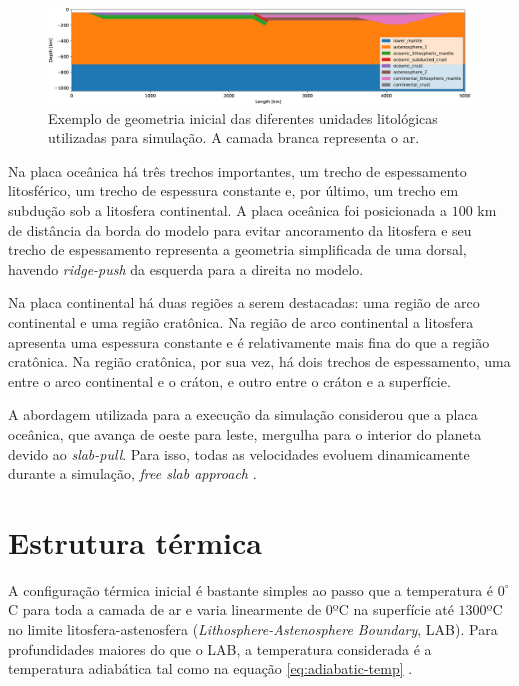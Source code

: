 \begin{figure}
    \centering
    \includegraphics[width=1.0 \textwidth]{fig/geometria-inicial.png}
    \caption{Exemplo de geometria inicial das diferentes unidades litológicas utilizadas para simulação. A camada branca representa o ar.}
    \label{fig:geometria-inicial}
\end{figure}

Na placa oceânica há três trechos importantes, um trecho de espessamento litosférico, um trecho de espessura constante e, por último, um trecho em subdução sob a litosfera continental. A placa oceânica foi posicionada a $100$ km de distância da borda do modelo para evitar ancoramento da litosfera e seu trecho de espessamento representa a geometria simplificada de uma dorsal, havendo \textit{ridge-push} da esquerda para a direita no modelo.

Na placa continental há duas regiões a serem destacadas: uma região de arco continental e uma região cratônica. Na região de arco continental a litosfera apresenta uma espessura constante e é relativamente mais fina do que a região cratônica. Na região cratônica, por sua vez, há dois trechos de espessamento, uma entre o arco continental e o cráton, e outro entre o cráton e a superfície. 

A abordagem utilizada para a execução da simulação considerou que a placa oceânica, que avança de oeste para leste, mergulha para o interior do planeta devido ao \textit{slab-pull}. Para isso, todas as velocidades evoluem dinamicamente durante a simulação, \textit{free slab approach} \citep{assuncao2019}.

\section{Estrutura térmica}

A configuração térmica inicial é bastante simples ao passo que a temperatura é $0^{\circ}$C para toda a camada de ar e varia linearmente de $0$ºC na superfície até $1300$ºC no limite litosfera-astenosfera (\textit{Lithosphere-Astenosphere Boundary}, LAB). Para profundidades maiores do que o LAB, a temperatura considerada é a temperatura adiabática tal como na equação \ref{eq:adiabatic-temp} \citep{turcotte2002geodynamics}.

